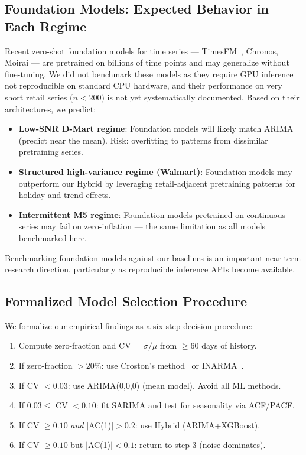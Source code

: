 \documentclass[journal]{IEEEtran}
\begin{document}
\subsection{Foundation Models: Expected Behavior in Each Regime}

Recent zero-shot foundation models for time series — TimesFM~\cite{ekambaram2024ttm}, Chronos, Moirai — are pretrained on billions of time points and may generalize without fine-tuning. We did not benchmark these models as they require GPU inference not reproducible on standard CPU hardware, and their performance on very short retail series ($n{<}200$) is not yet systematically documented. Based on their architectures, we predict:

\begin{itemize}
  \item \textbf{Low-SNR D-Mart regime}: Foundation models will likely match ARIMA (predict near the mean). Risk: overfitting to patterns from dissimilar pretraining series.
  \item \textbf{Structured high-variance regime (Walmart)}: Foundation models may outperform our Hybrid by leveraging retail-adjacent pretraining patterns for holiday and trend effects.
  \item \textbf{Intermittent M5 regime}: Foundation models pretrained on continuous series may fail on zero-inflation — the same limitation as all models benchmarked here.
\end{itemize}

Benchmarking foundation models against our baselines is an important near-term research direction, particularly as reproducible inference APIs become available.

\subsection{Formalized Model Selection Procedure}

We formalize our empirical findings as a six-step decision procedure:

\begin{enumerate}
  \item Compute zero-fraction and CV$\,= \sigma/\mu$ from $\geq 60$ days of history.
  \item If zero-fraction $>20\%$: use Croston's method~\cite{croston1972forecasting} or INARMA~\cite{mckenzie1985some}.
  \item If CV $<0.03$: use ARIMA(0,0,0) (mean model). Avoid all ML methods.
  \item If $0.03 \leq$ CV $<0.10$: fit SARIMA and test for seasonality via ACF/PACF.
  \item If CV $\geq 0.10$ \emph{and} $|$AC(1)$| > 0.2$: use Hybrid (ARIMA+XGBoost).
  \item If CV $\geq 0.10$ but $|$AC(1)$| < 0.1$: return to step 3 (noise dominates).
\end{enumerate}
\end{document}
